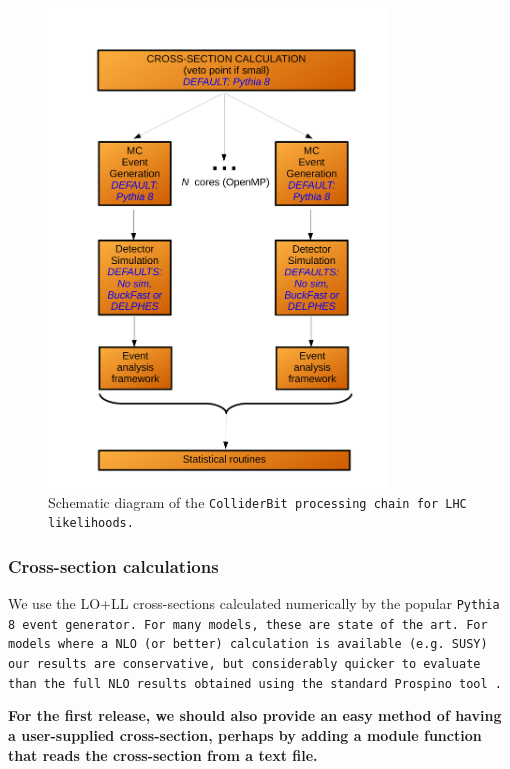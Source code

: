 \begin{figure}[ht]
\centering
\includegraphics[width=0.8\textwidth]{figures/Gambit-LHC-Chain.pdf}
\caption{Schematic diagram of the \tt ColliderBit \rm processing chain for LHC likelihoods.\label{fig:lhcchain}}
\end{figure}

\subsubsection{Cross-section calculations}

We use the LO+LL cross-sections calculated numerically by the popular \tt Pythia 8 \rm event generator. For many models, these are state of the art. For models where a NLO (or better) calculation is available (e.g. SUSY) our results are conservative, but considerably quicker to evaluate than the full NLO results obtained using the standard \tt Prospino \rm tool~\cite{Beenakker:1996ed}. 

\textbf{For the first release, we should also provide an easy method of having a user-supplied cross-section, perhaps by adding a module function that reads the cross-section from a text file.}

